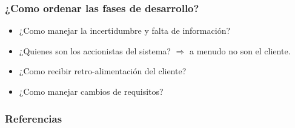 \documentclass{beamer}
\begin{document}
\begin{frame}
    \frametitle{¿Como ordenar las fases de desarrollo?}
    \begin{itemize}
    \item ¿Como manejar la incertidumbre y falta de informaci\'on?
    \item ¿Quienes son los accionistas del sistema? $\Rightarrow$ a menudo no son el cliente.
    \item ¿Como recibir retro-alimentaci\'on del cliente?
    \item ¿Como manejar cambios de requisitos?
    \end{itemize}
\end{frame}

\begin{frame}
\frametitle{Referencias}


\end{frame}
\end{document}
